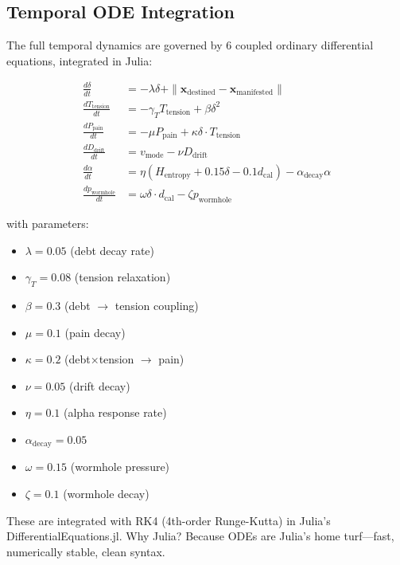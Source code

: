 \documentclass[11pt,a4paper]{article}
\begin{document}
\subsection{Temporal ODE Integration}

The full temporal dynamics are governed by 6 coupled ordinary differential equations, integrated in Julia:

\begin{align}
\frac{d\delta}{dt} &= -\lambda \delta + \|\mathbf{x}_{\text{destined}} - \mathbf{x}_{\text{manifested}}\| \label{eq:ode1} \\
\frac{d T_{\text{tension}}}{dt} &= -\gamma_T T_{\text{tension}} + \beta \delta^2 \label{eq:ode2} \\
\frac{d P_{\text{pain}}}{dt} &= -\mu P_{\text{pain}} + \kappa \delta \cdot T_{\text{tension}} \label{eq:ode3} \\
\frac{d D_{\text{drift}}}{dt} &= v_{\text{mode}} - \nu D_{\text{drift}} \label{eq:ode4} \\
\frac{d\alpha}{dt} &= \eta (H_{\text{entropy}} + 0.15\delta - 0.1 d_{\text{cal}}) - \alpha_{\text{decay}} \alpha \label{eq:ode5} \\
\frac{dp_{\text{wormhole}}}{dt} &= \omega \delta \cdot d_{\text{cal}} - \zeta p_{\text{wormhole}} \label{eq:ode6}
\end{align}

with parameters:

\begin{itemize}
\item $\lambda = 0.05$ (debt decay rate)
\item $\gamma_T = 0.08$ (tension relaxation)
\item $\beta = 0.3$ (debt $\to$ tension coupling)
\item $\mu = 0.1$ (pain decay)
\item $\kappa = 0.2$ (debt×tension $\to$ pain)
\item $\nu = 0.05$ (drift decay)
\item $\eta = 0.1$ (alpha response rate)
\item $\alpha_{\text{decay}} = 0.05$
\item $\omega = 0.15$ (wormhole pressure)
\item $\zeta = 0.1$ (wormhole decay)
\end{itemize}

These are integrated with RK4 (4th-order Runge-Kutta) in Julia's DifferentialEquations.jl. Why Julia? Because ODEs are Julia's home turf—fast, numerically stable, clean syntax.
\end{document}
